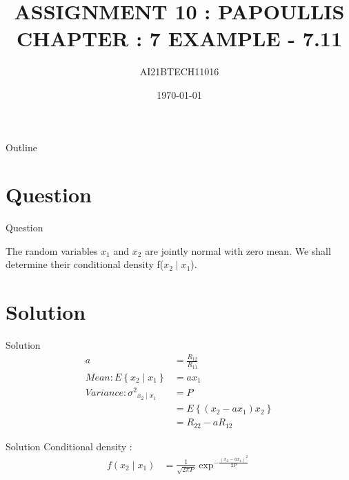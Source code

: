 \documentclass{beamer}
\title{ASSIGNMENT 10 : PAPOULLIS CHAPTER : 7 EXAMPLE - 7.11}
\author{AI21BTECH11016}
\date{\today}
\providecommand{\brak}[1]{\ensuremath{\left(#1\right)}}
\providecommand{\cbrak}[1]{\ensuremath{\left\{#1\right\}}}
\begin{document}
\begin{frame}
    \titlepage 
\end{frame}

\logo{}

\begin{frame}{Outline}
    \tableofcontents
\end{frame}

\section{Question}
\begin{frame}{Question}
\begin{block}{}
The random variables $x_1$ and $x_2$ are jointly normal with zero mean. We shall determine their conditional density f($x_2 \mid x_1$). 
\end{block}
\end{frame}

\section{Solution}
\begin{frame}{Solution}
\begin{align}
a & = \frac{R_{12}}{R_{11}} \\
Mean : E \cbrak{x_2 \mid x_1} & = ax_1 \\
Variance : {\sigma^2}_{x_2 \mid x_1} & = P \\ & = E\cbrak{(x_2 - ax_1)x_2} \\
& = R_{22} - aR_{12}
\end{align}
\end{frame}

\begin{frame}{Solution}
Conditional density :
\begin{align}
f(x_2 \mid x_1) & = \frac{1}{\sqrt{2 \pi P}} \exp^{-\frac{\brak{x_2 - ax_1}^2}{2P}}
\end{align}
\end{frame}
\end{document}
